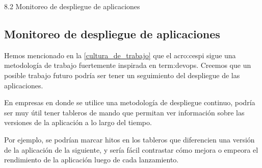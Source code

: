 8.2 Monitoreo de despliegue de aplicaciones
\subsection{Monitoreo de despliegue de aplicaciones}
\label{del-despliegue-de-aplicaciones}

Hemos mencionado en la \autoref{cultura_de_trabajo} que el \gls{acro:cespi}
sigue una metodología de trabajo fuertemente inspirada en \gls{term:devops}.
Creemos que un posible trabajo futuro podría ser tener un seguimiento del
despliegue de las aplicaciones.

En empresas en donde se utilice una metodología de despliegue continuo, podría
ser muy útil tener tableros de mando que permitan ver información sobre las
versiones de la aplicación a lo largo del tiempo.

Por ejemplo, se podrían marcar hitos en los tableros que diferencien una
versión de la aplicación de la siguiente, y sería fácil contrastar cómo mejora
o empeora el rendimiento de la aplicación luego de cada lanzamiento.
